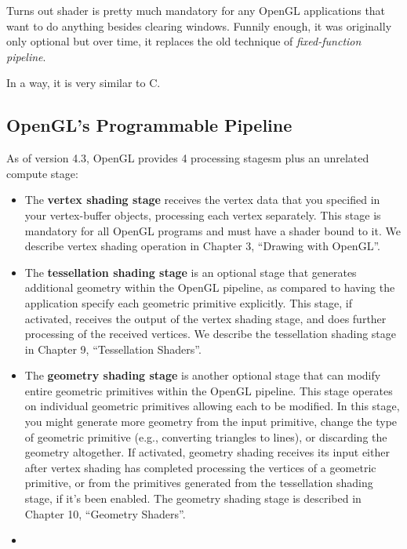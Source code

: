 \documentclass[a4paper, 12pt]{article}
\begin{document}
Turns out shader is pretty much mandatory for any OpenGL applications that want to do anything besides clearing windows.
Funnily enough, it was originally only optional but over time, it replaces the old technique of \textit{fixed-function pipeline}.

In a way, it is very similar to C.

\subsection{OpenGL's Programmable Pipeline}

As of version 4.3, OpenGL provides 4 processing stagesm plus an unrelated compute stage:

\begin{itemize}

      \item
            The \textbf{vertex shading stage} receives the vertex data that you specified in your vertex-buffer objects, processing each vertex separately.
            This stage is mandatory for all OpenGL programs and must have a shader bound to it.
            We describe vertex shading operation in Chapter 3, ``Drawing with OpenGL''.
      \item
            The \textbf{tessellation shading stage} is an optional stage that generates additional geometry within the OpenGL pipeline, as compared to having the application specify each geometric primitive explicitly.
            This stage, if activated, receives the output of the vertex shading stage, and does further processing of the received vertices.
            We describe the tessellation shading stage in Chapter 9, ``Tessellation Shaders''.
      \item
            The \textbf{geometry shading stage} is another optional stage that can modify entire geometric primitives within the OpenGL pipeline.
            This stage operates on individual geometric primitives allowing each to be modified.
            In this stage, you might generate more geometry from the input primitive, change the type of geometric primitive (e.g., converting triangles to lines), or discarding the geometry altogether.
            If activated, geometry shading receives its input either after vertex shading has completed processing the vertices of a geometric primitive, or from the primitives generated from the tessellation shading stage, if it's been enabled.
            The geometry shading stage is described in Chapter 10, ``Geometry Shaders''.
      \item

\end{itemize}
\end{document}
